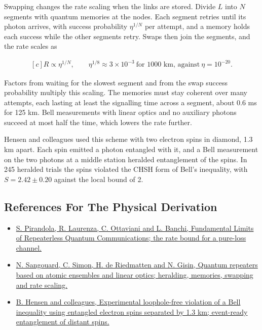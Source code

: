 \documentclass[11pt,oneside]{book}
\newenvironment{centeredalign}{\[\begin{gathered}[c]}{\end{gathered}\]}
\begin{document}
Swapping changes the rate scaling when the links are stored. Divide \(L\) into \(N\) segments with quantum memories at the nodes. Each segment retries until its photon arrives, with success probability \(\eta^{1/N}\) per attempt, and a memory holds each success while the other segments retry. Swaps then join the segments, and the rate scales as

\begin{centeredalign}
R\propto\eta^{1/N},\qquad \eta^{1/8}\approx3\times10^{-3}\ \text{for 1000 km, against}\ \eta=10^{-20}.
\end{centeredalign}

Factors from waiting for the slowest segment and from the swap success probability multiply this scaling. The memories must stay coherent over many attempts, each lasting at least the signalling time across a segment, about 0.6 ms for 125 km. Bell measurements with linear optics and no auxiliary photons succeed at most half the time, which lowers the rate further.

Hensen and colleagues used this scheme with two electron spins in diamond, 1.3 km apart. Each spin emitted a photon entangled with it, and a Bell measurement on the two photons at a middle station heralded entanglement of the spins. In 245 heralded trials the spins violated the CHSH form of Bell's inequality, with \(S=2.42\pm0.20\) against the local bound of 2.

\subsection*{References For The Physical Derivation}
\begin{itemize}
\item \href{https://arxiv.org/abs/1510.08863}{S. Pirandola, R. Laurenza, C. Ottaviani and L. Banchi, Fundamental Limits of Repeaterless Quantum Communications; the rate bound for a pure-loss channel.}
\item \href{https://arxiv.org/abs/0906.2699}{N. Sangouard, C. Simon, H. de Riedmatten and N. Gisin, Quantum repeaters based on atomic ensembles and linear optics; heralding, memories, swapping and rate scaling.}
\item \href{https://arxiv.org/abs/1508.05949}{B. Hensen and colleagues, Experimental loophole-free violation of a Bell inequality using entangled electron spins separated by 1.3 km; event-ready entanglement of distant spins.}
\end{itemize}
\end{document}
